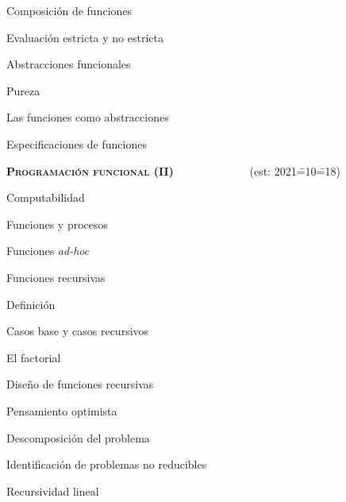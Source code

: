 \begin{longenum}
\begin{longenum}
\begin{longenum}
\begin{longenum}
\begin{longenum}
                \end{longenum}
                \item Composición de funciones
                \item Evaluación estricta y no estricta
            \end{longenum}
        \end{longenum}
        \item Abstracciones funcionales
        \begin{longenum}
            \item Pureza
            \item Las funciones como abstracciones
            \begin{longenum}
                \item Especificaciones de funciones
            \end{longenum}
        \end{longenum}
    \end{longenum}
    \item \textbf{\textsc{Programación funcional (II)}} \ \ \ \ \ \ \ \ \ \ \ \ \ (est: 2021\==10\==18)
    \begin{longenum}
        \item Computabilidad
        \begin{longenum}
            \item Funciones y procesos
            \item Funciones \textit{ad-hoc}
            \item Funciones recursivas
            \begin{longenum}
                \item Definición
                \item Casos base y casos recursivos
                \item El factorial
                \item Diseño de funciones recursivas
                \begin{longenum}
                    \item Pensamiento optimista
                    \item Descomposición del problema
                    \item Identificación de problemas no reducibles
                \end{longenum}
                \item Recursividad lineal

\end{longenum}
\end{longenum}
\end{longenum}
\end{longenum}
